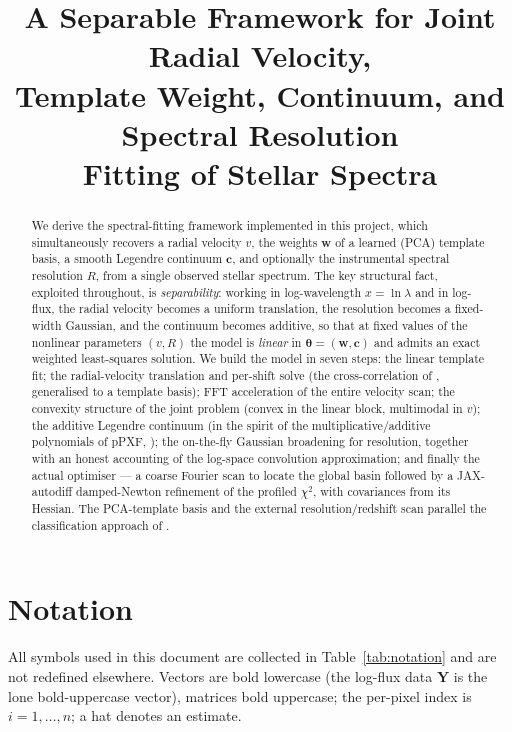 \documentclass[11pt]{article}
\title{A Separable Framework for Joint Radial Velocity,\\
Template Weight, Continuum, and Spectral Resolution\\
Fitting of Stellar Spectra}
\author{}
\date{}
\begin{document}
\maketitle

\begin{abstract}
We derive the spectral-fitting framework implemented in this project, which
simultaneously recovers a radial velocity $v$, the weights $\mathbf{w}$ of a
learned (PCA) template basis, a smooth Legendre continuum $\mathbf{c}$, and
optionally the instrumental spectral resolution $R$, from a single observed
stellar spectrum. The key structural fact, exploited throughout, is
\emph{separability}: working in log-wavelength $x=\ln\lambda$ and in log-flux,
the radial velocity becomes a uniform translation, the resolution becomes a
fixed-width Gaussian, and the continuum becomes additive, so that at fixed values
of the nonlinear parameters $(v,R)$ the model is \emph{linear} in
$\boldsymbol\theta=(\mathbf{w},\mathbf{c})$ and admits an exact weighted
least-squares solution. We build the model in seven steps: the linear template
fit; the radial-velocity translation and per-shift solve (the cross-correlation
of \citealt*{TonryDavis1979}, generalised to a template basis); FFT acceleration
of the entire velocity scan; the convexity structure of the joint problem
(convex in the linear block, multimodal in $v$); the additive Legendre continuum
(in the spirit of the multiplicative/additive polynomials of pPXF,
\citealt*{Cappellari2017}); the on-the-fly Gaussian broadening for resolution,
together with an honest accounting of the log-space convolution approximation;
and finally the actual optimiser --- a coarse Fourier scan to locate the global
basin followed by a JAX-autodiff damped-Newton refinement of the profiled
$\chi^2$, with covariances from its Hessian. The PCA-template basis and the
external resolution/redshift scan parallel the classification approach of
\citet*{Bolton2012}.
\end{abstract}

\section*{Notation}
All symbols used in this document are collected in Table~\ref{tab:notation} and
are not redefined elsewhere. Vectors are bold lowercase (the log-flux data $\mathbf{Y}$ is the lone
bold-uppercase vector), matrices bold uppercase; the per-pixel index is $i=1,\dots,n$; a hat denotes an estimate.
\end{document}

